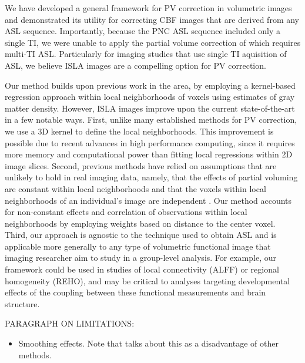 \documentclass[review]{elsarticle}
\begin{document}
We have developed a general framework for PV correction in volumetric images and demonstrated its utility for correcting CBF images that are derived from any ASL sequence. Importantly, because the PNC ASL sequence included only a single TI, we were unable to apply the partial volume correction of \citep{chappell2011partial} which requires multi-TI ASL. Particularly for imaging studies that use single TI aquisition of ASL, we believe ISLA images are a compelling option for PV correction.

Our method builds upon previous work in the area, by employing a kernel-based regression approach within local neighborhoods of voxels using estimates of gray matter density. However, ISLA images improve upon the current state-of-the-art in a few notable ways. First, unlike many established methods for PV correction, we use a 3D kernel to define the local neighborhoods. This improvement is possible due to recent advances in high performance computing, since it requires more memory and computational power than fitting local regressions within 2D image slices. Second, previous methods have relied on assumptions that are unlikely to hold in real imaging data, namely, that the effects of partial voluming are constant within local neighborhoods and that the voxels within local neighborhoods of an individual's image are independent \citep{asllani2008regression,ahlgren2014partial}. Our method accounts for non-constant effects and correlation of observations within local neighborhoods by employing weights based on distance to the center voxel. Third, our approach is agnostic to the technique used to obtain ASL and is applicable more generally to any type of volumetric functional image that imaging researcher aim to study in a group-level analysis. For example, our framework could be used in studies of local connectivity (ALFF) or regional homogeneity (REHO), and may be critical to analyses targeting developmental effects of the coupling between these functional measurements and brain structure.

\vspace{5mm}
\noindent PARAGRAPH ON LIMITATIONS:
\begin{itemize}
\item Smoothing effects. Note that \citep{chappell2011partial} talks about this as a disadvantage of other methods.
\end{itemize}


\newpage





%

\end{document}
